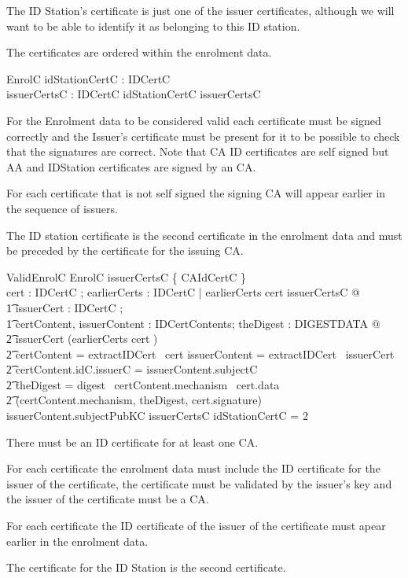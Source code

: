 The ID Station's certificate is just one of the issuer certificates,
although we will want to be able to identify it as belonging to this
ID station. 

The certificates are ordered within the enrolment data.

\begin{schema}{EnrolC}
        idStationCertC : IDCertC
\\      issuerCertsC : \iseq IDCertC
\where
        idStationCertC \in \ran issuerCertsC
\end{schema}

For the Enrolment data to be considered valid each certificate must be
signed correctly and the Issuer's certificate must be present for it
to be possible to check that the signatures are correct.
Note that CA ID
certificates are self signed but AA and IDStation certificates are
signed by an CA.

For each certificate that is not self signed the signing CA will
appear earlier in the sequence of issuers.

The ID station certificate is the second certificate in the enrolment
data and must be preceded by the certificate for the issuing CA.

\begin{schema}{ValidEnrolC}
        EnrolC
\where
        \ran issuerCertsC \cap \{ CAIdCertC \} \neq \emptyset
\also
\\      \forall cert : IDCertC ; earlierCerts : \seq IDCertC 
         | earlierCerts \cat \langle cert \rangle \prefix  issuerCertsC @ 
\\      \t1     \exists issuerCert : IDCertC ; 
\\      \t1     certContent, issuerContent : IDCertContents; theDigest
: DIGESTDATA @
\\      \t2     issuerCert \in \ran (earlierCerts \cat \langle cert \rangle) 
\\      \t2     \land certContent = extractIDCert~ cert \land issuerContent = extractIDCert~ issuerCert
\\      \t2     \land certContent.idC.issuerC = issuerContent.subjectC 
\\      \t2     \land theDigest = digest~ certContent.mechanism~ cert.data
\\      \t2     \land (certContent.mechanism, theDigest, cert.signature) \isVerifiedBy issuerContent.subjectPubKC
\also
        issuerCertsC \inv idStationCertC = 2 


\end{schema}
\begin{Zcomment}
\item
There must be an ID certificate for at least one CA.
\item
For each certificate the enrolment data must include the ID
certificate for the issuer of the certificate, the certificate must be
validated by the issuer's key and the issuer of the
certificate must be a CA.
\item 
For each certificate the ID certificate of the issuer of the
certificate must apear earlier in the enrolment data.
\item
The certificate for the ID Station is the second certificate. 
\end{Zcomment}

